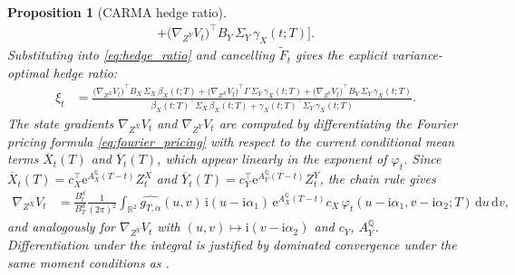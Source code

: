 \documentclass[10pt,a4paper,reqno]{amsart}
\newtheorem{proposition}[theorem]{Proposition}
\newcommand{\R}{\mathbb{R}}
\newcommand{\Q}{\mathbb{Q}}
\newcommand{\1}{\mathbbm{1}}
\newcommand{\dd}{\mathrm{d}}
\newcommand{\ii}{\mathrm{i}}
\newcommand{\ee}{\mathrm{e}}
\begin{document}
\begin{proposition}[CARMA hedge ratio]
\begin{align}
       + \bigl(\nabla_{Z^Y} V_t\bigr)^\top B_Y\,\Sigma_Y\,\gamma_X(t;T)
     \Bigr].
\end{align}
Substituting into \eqref{eq:hedge_ratio} and cancelling $\widetilde{F}_t$
gives the explicit variance-optimal hedge ratio:
\begin{align}\label{eq:hedge_ratio_carma}
  \xi_t
  &= \frac{
       \bigl(\nabla_{Z^X} V_t\bigr)^\top B_X\,\Sigma_X\,\beta_X(t;T)
       + \bigl(\nabla_{Z^X} V_t\bigr)^\top \Gamma\,\Sigma_Y\,\gamma_X(t;T)
       + \bigl(\nabla_{Z^Y} V_t\bigr)^\top B_Y\,\Sigma_Y\,\gamma_X(t;T)
     }{
       \beta_X(t;T)^\top \Sigma_X\,\beta_X(t;T)
       + \gamma_X(t;T)^\top \Sigma_Y\,\gamma_X(t;T)
     }.
\end{align}
The state gradients $\nabla_{Z^X} V_t$ and $\nabla_{Z^Y} V_t$ are computed by
differentiating the Fourier pricing formula \eqref{eq:fourier_pricing} with
respect to the current conditional mean terms $\overline{X}_t(T)$ and
$\overline{Y}_t(T)$, which appear linearly in the exponent of $\varphi_t$.
Since $\overline{X}_t(T) = c_X^\top \ee^{A_X^\Q(T-t)}Z_t^X$ and
$\overline{Y}_t(T) = c_Y^\top \ee^{A_Y^\Q(T-t)}Z_t^Y$, the chain rule gives
\begin{align}\label{eq:state_gradient_V}
  \nabla_{Z^X} V_t
  &= \frac{B_t^d}{B_T^d}
     \frac{1}{(2\pi)^2}
     \int_{\R^2}
       \widehat{g_{T,\alpha}}(u,v)\,
       \ii(u - \ii\alpha_1)\,
       \ee^{A_X^\Q(T-t)} c_X\,
       \varphi_t(u-\ii\alpha_1, v-\ii\alpha_2; T)
     \,\dd u\,\dd v,
\end{align}
and analogously for $\nabla_{Z^Y} V_t$ with $(u,v) \mapsto
\ii(v-\ii\alpha_2)$ and $c_Y$, $A_Y^\Q$.
Differentiation under the integral is justified by dominated convergence under
the same moment conditions as .
\end{proposition}
\end{document}
